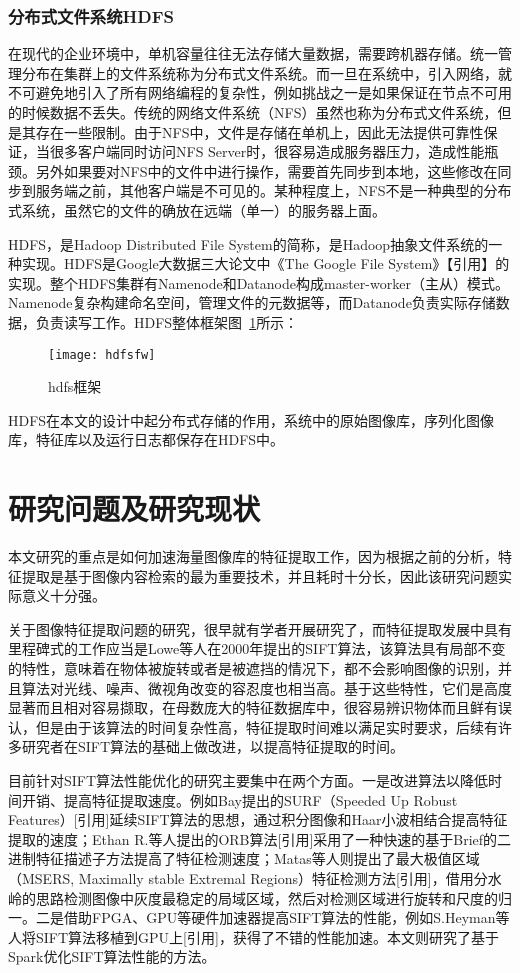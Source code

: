 \subsubsection{分布式文件系统HDFS}
在现代的企业环境中，单机容量往往无法存储大量数据，需要跨机器存储。统一管理分布在集群上的文件系统称为分布式文件系统。而一旦在系统中，引入网络，就不可避免地引入了所有网络编程的复杂性，例如挑战之一是如果保证在节点不可用的时候数据不丢失。传统的网络文件系统（NFS）虽然也称为分布式文件系统，但是其存在一些限制。由于NFS中，文件是存储在单机上，因此无法提供可靠性保证，当很多客户端同时访问NFS Server时，很容易造成服务器压力，造成性能瓶颈。另外如果要对NFS中的文件中进行操作，需要首先同步到本地，这些修改在同步到服务端之前，其他客户端是不可见的。某种程度上，NFS不是一种典型的分布式系统，虽然它的文件的确放在远端（单一）的服务器上面。

HDFS，是Hadoop Distributed File System的简称，是Hadoop抽象文件系统的一种实现。HDFS是Google大数据三大论文中《The Google File System》【引用】的实现。整个HDFS集群有Namenode和Datanode构成master-worker（主从）模式。Namenode复杂构建命名空间，管理文件的元数据等，而Datanode负责实际存储数据，负责读写工作。HDFS整体框架图~\ref{fig:hdfsfw}所示：
\begin{figure}[htp]
\centering
\texttt{[image: hdfsfw]}
\caption{hdfs框架}
\label{fig:hdfsfw}
\end{figure}

HDFS在本文的设计中起分布式存储的作用，系统中的原始图像库，序列化图像库，特征库以及运行日志都保存在HDFS中。

\section{研究问题及研究现状}
本文研究的重点是如何加速海量图像库的特征提取工作，因为根据之前的分析，特征提取是基于图像内容检索的最为重要技术，并且耗时十分长，因此该研究问题实际意义十分强。

关于图像特征提取问题的研究，很早就有学者开展研究了，而特征提取发展中具有里程碑式的工作应当是Lowe等人在2000年提出的SIFT算法，该算法具有局部不变的特性，意味着在物体被旋转或者是被遮挡的情况下，都不会影响图像的识别，并且算法对光线、噪声、微视角改变的容忍度也相当高。基于这些特性，它们是高度显著而且相对容易撷取，在母数庞大的特征数据库中，很容易辨识物体而且鲜有误认，但是由于该算法的时间复杂性高，特征提取时间难以满足实时要求，后续有许多研究者在SIFT算法的基础上做改进，以提高特征提取的时间。

目前针对SIFT算法性能优化的研究主要集中在两个方面。一是改进算法以降低时间开销、提高特征提取速度。例如Bay提出的SURF（Speeded Up Robust Features）[引用]延续SIFT算法的思想，通过积分图像和Haar小波相结合提高特征提取的速度；Ethan R.等人提出的ORB算法[引用]采用了一种快速的基于Brief的二进制特征描述子方法提高了特征检测速度；Matas等人则提出了最大极值区域（MSERS, Maximally stable Extremal Regions）特征检测方法[引用]，借用分水岭的思路检测图像中灰度最稳定的局域区域，然后对检测区域进行旋转和尺度的归一。二是借助FPGA、GPU等硬件加速器提高SIFT算法的性能，例如S.Heyman等人将SIFT算法移植到GPU上[引用]，获得了不错的性能加速。本文则研究了基于Spark优化SIFT算法性能的方法。

